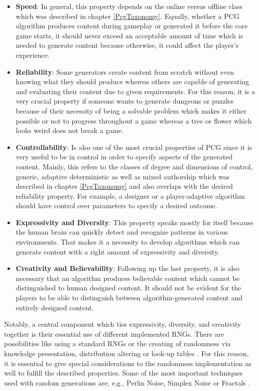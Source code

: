 \documentclass[MGS,Master,english]{twbook}%
\begin{document}
\begin{itemize}
	\item \textbf{Speed}: In general, this property depends on the online versus offline class which was described in chapter \ref{PcgTaxonomy}. Equally, whether a PCG algorithm produces content during gameplay or generated it before the core game starts, it should never exceed an acceptable amount of time which is needed to generate content because otherwise, it could affect the player’s experience. \cite{pcg::book}
	\item \textbf{Reliability}: Some generators create content from scratch without even knowing what they should produce whereas others are capable of generating and evaluating their content due to given requirements. For this reason, it is a very crucial property if someone wants to generate dungeons or puzzles because of their necessity of being a solvable problem which makes it either possible or not to progress throughout a game whereas a tree or flower which looks weird does not break a game. \cite{pcg::book}
	\item \textbf{Controllability}: Is also one of the most crucial properties of PCG since it is very useful to be in control in order to specify aspects of the generated content. Mainly, this refers to the classes of degree and dimensions of control, generic, adaptive deterministic as well as mixed authorship which was described in chapter \ref{PcgTaxonomy} and also overlaps with the desired reliability property. For example, a designer or a player-adaptive algorithm should have control over parameters to specify a desired outcome. \cite{pcg::book}
	\item \textbf{Expressivity and Diversity}: This property speaks mostly for itself because the human brain can quickly detect and recognize patterns in various environments. That makes it a necessity to develop algorithms which can generate content with a right amount of expressivity and diversity. \cite{pcg::book}
	\item \textbf{Creativity and Believability}: Following up the last property, it is also necessary that an algorithm produces believable content which cannot be distinguished to human designed content. It should not be evident for the players to be able to distinguish between algorithm-generated content and entirely designed content. \cite{pcg::book}
\end{itemize}
Notably, a central component which ties expressivity, diversity, and creativity together is their essential use of different implemented RNGs. There are possibilities like using a standard RNGs or the creating of randomness via knowledge presentation, distribution altering or look-up tables \cite{pcg::book}. For this reason, it is essential to give special considerations to the randomness implementation as well to fulfill the described properties. Some of the most important techniques used with random generations are, e.g., Perlin Noise, Simplex Noise or Fractals \cite{pcg::shortHistoryOfDynamicAndPCG}.\\
\end{document}
